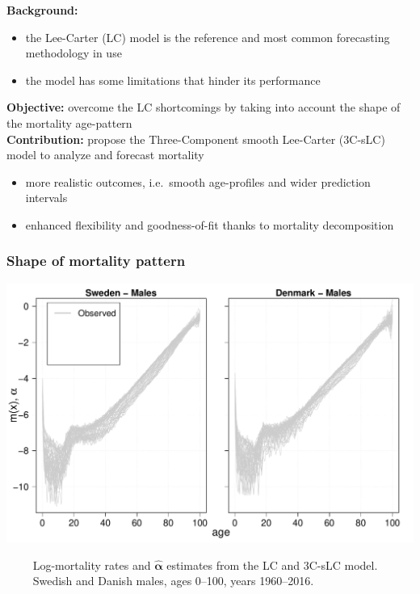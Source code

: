 \documentclass[12pt, xcolor=table]{beamer}  %
\begin{document}
\begin{frame}
	\textbf{Background:}
	\begin{itemize}
		\setlength\itemsep{0.5em}
		\item the Lee-Carter (LC) model is the reference and most common forecasting methodology in use 
		\item the model has some limitations that hinder its performance 
	\end{itemize}
	\bigskip \pause
	\textbf{Objective:} overcome the LC shortcomings by taking into account the shape of the mortality age-pattern
	\\ \bigskip \pause
	\textbf{Contribution:} propose the Three-Component smooth Lee-Carter (3C-sLC) model to analyze and forecast mortality
	\begin{itemize}
		\setlength\itemsep{0.5em}
		\item more realistic outcomes, i.e.~smooth age-profiles and wider prediction intervals 
		\item enhanced flexibility and goodness-of-fit thanks to mortality decomposition
	\end{itemize}
	
\end{frame}

\begin{frame}          
	\frametitle{Shape of mortality pattern}
	\begin{center}
		\includegraphics[scale=0.41]{Figures/Ch5/Alpha1}
	\end{center}

\vspace{-0.35cm}
\tiny{$\quad\quad$ Log-mortality rates and $\bm{\hat{\alpha}}$ estimates from the LC and 3C-sLC model. \\ $\quad\quad$ Swedish and Danish males, ages 0--100, years 1960--2016.}

	
\end{frame}
\end{document}
